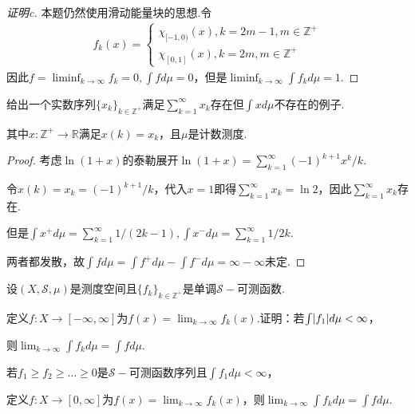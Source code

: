 \begin{proof}[证明c]
    {\kaishu 本题仍然使用滑动能量块的思想.}令
    \begin{align*}
        f_k(x)=
        \begin{cases}
            \chi_{[-1,0)}(x), k=2m-1, m \in \mathbb{Z}^+ \\
            \chi_{[0,1]}(x), k=2m, m \in \mathbb{Z}^+
        \end{cases}
    \end{align*}
    因此\(f=\liminf_{k \to \infty}f_k=0, \int f d\mu=0\)，但是\(\liminf_{k \to \infty} \int f_k d\mu=1\).
\end{proof}

\begin{problem}[18]\label{3.A.18}
    给出一个实数序列\(\{x_k\}_{k \in \mathbb{Z}^+}\)满足\(\sum_{k=1}^\infty x_k\)存在但\(\int x d\mu\)不存在的例子.

    其中\(x: \mathbb{Z}^+ \to \mathbb{R}\)满足\(x(k)=x_k\)，且\(\mu\)是计数测度.
\end{problem}

\begin{proof}
    考虑\(\ln(1+x)\)的泰勒展开\(\ln(1+x)=\sum_{k=1}^\infty (-1)^{k+1}x^k/k\).

    令\(x(k)=x_k=(-1)^{k+1}/k\)，代入\(x=1\)即得\(\sum_{k=1}^\infty x_k=\ln 2\)，因此\(\sum_{k=1}^\infty x_k\)存在.

    但是\(\int x^+ d\mu=\sum_{k=1}^\infty 1/(2k-1), \int x^- d\mu=\sum_{k=1}^\infty 1/2k\).

    两者都发散，故\(\int f d\mu=\int f^+ d\mu-\int f^- d\mu=\infty-\infty\)未定.
\end{proof}

\newpage

\begin{problem}[20]\label{3.A.20}
    设\((X, \mathcal{S}, \mu)\)是测度空间且\(\{f_k\}_{k \in \mathbb{Z}^+}\)是单调\(\mathcal{S}-\)可测函数.

    定义\(f: X \to [-\infty,\infty]\)为\(f(x)=\lim_{k \to \infty}f_k(x)\).证明：若\(\int \abs*{f_1} d\mu<\infty\)，
    
    则\(\lim_{k \to \infty} \int f_k d\mu=\int f d\mu\).
\end{problem}

\begin{lemma}[20.1]\label{3.A.20.1}
    若\(f_1 \geq f_2 \geq \dots \geq 0\)是\(\mathcal{S}-\)可测函数序列且\(\int f_1 d\mu<\infty\)，

    定义\(f: X \to [0,\infty]\)为\(f(x)=\lim_{k \to \infty}f_k(x)\)，则\(\lim_{k \to \infty} \int f_k d\mu=\int f d\mu\).
\end{lemma}

